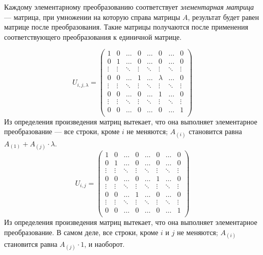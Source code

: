 \documentclass[a4paper, 12pt]{article}
\begin{document}
Каждому элементарному преобразованию соответствует \emph{элементарная матрица} --- матрица, при умножении на которую справа матрицы $A$, результат будет равен матрице после преобразования. Такие матрицы получаются после применения соответствующего преобразования к единичной матрице.

\[
    U_{i,j,\lambda} =
    \begin{pmatrix}
        1       &0      &\ldots &0      &\ldots &0      &\ldots &0\\
        0       &1      &\ldots &0      &\ldots &0      &\ldots &0\\
        \vdots  &\vdots &\ddots &\vdots &\ddots &\vdots &\ddots &\vdots\\
        0       &0      &\ldots &1      &\ldots &\lambda&\ldots &0\\
        \vdots  &\vdots &\ddots &\vdots &\ddots &\vdots &\ddots &\vdots\\
        0       &0      &\ldots &0      &\ldots &1      &\ldots &0\\
        \vdots  &\vdots &\ddots &\vdots &\ddots &\vdots &\ddots &\vdots\\
        0       &0      &\ldots &0      &\ldots &0      &\ldots &1\\
    \end{pmatrix}
\]
Из определения произведения матриц вытекает, что она выполняет элементарное преобразование --- все строки, кроме $i$ не меняются; $A_{(i)}$ становится равна $A_{(1)} + A_{(j)}\cdot \lambda$.
\[
    U_{i,j} =
    \begin{pmatrix}
        1       &0      &\ldots &0      &\ldots &0      &\ldots &0\\
        0       &1      &\ldots &0      &\ldots &0      &\ldots &0\\
        \vdots  &\vdots &\ddots &\vdots &\ddots &\vdots &\ddots &\vdots\\
        0       &0      &\ldots &0      &\ldots &1      &\ldots &0\\
        \vdots  &\vdots &\ddots &\vdots &\ddots &\vdots &\ddots &\vdots\\
        0       &0      &\ldots &1      &\ldots &0      &\ldots &0\\
        \vdots  &\vdots &\ddots &\vdots &\ddots &\vdots &\ddots &\vdots\\
        0       &0      &\ldots &0      &\ldots &0      &\ldots &1\\
    \end{pmatrix}
\]
Из определения произведения матриц вытекает, что она выполняет элементарное преобразование. В самом деле, все строки, кроме $i$ и $j$ не меняются; $A_{(i)}$ становится равна $A_{(j)}\cdot 1$, и наоборот.
\end{document}
